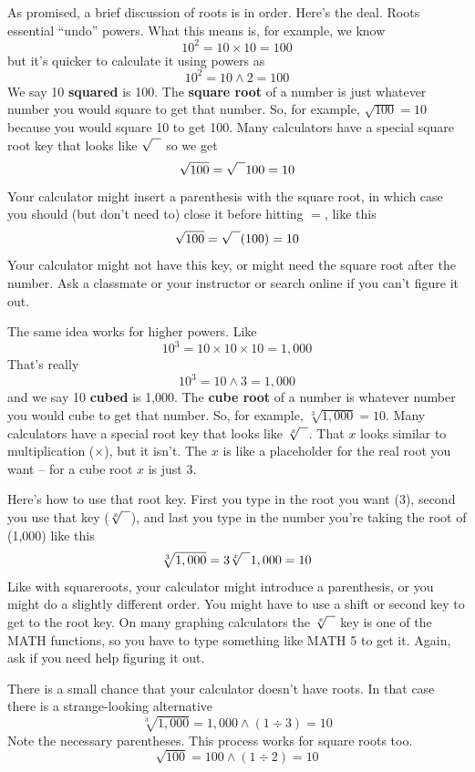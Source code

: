 As promised, a brief discussion of roots is in order.  
Here's the deal.  Roots essential ``undo'' powers.  What this means is, for example, we know $$10^2=10 \times 10 =100$$  but it's quicker to calculate it using powers as $$10^2 = 10 \wedge 2 = 100$$  We say 10 \textbf{squared} is 100.  The \textbf{square root} of a number is just whatever number you would square to get that number.  So, for example, $\sqrt{100} = 10$ because you would square 10 to get 100.  Many calculators have a special square root key that looks like $\sqrt{\text{\raisebox{.6em}{~\text{  }}}} $ so we get 
$$\sqrt{100} = \sqrt{\text{\raisebox{.6em}{~\text{  }}}} 100 = 10$$  
Your calculator might insert a parenthesis with the square root, in which case you should (but don't need to) close it before hitting $=$, like this
$$\sqrt{100} = \sqrt{\text{\raisebox{.6em}{~\text{  }}}} ( 100 ) = 10$$ 
Your calculator might not have this key, or might need the square root after the number.  Ask a classmate or your instructor or search online if you can't figure it out.

The same idea works for higher powers.  Like $$10^3 =10 \times 10 \times 10 = 1,000$$ That's really  $$10^3 = 10 \wedge 3 = 1,000$$ and we say
10 \textbf{cubed} is 1,000.  The \textbf{cube root} of a number is whatever number you would cube to get that number.  So, for example, $\sqrt[3]{1,000} = 10$.  Many calculators have a special root key that looks like $\sqrt[x]{\text{\raisebox{.6em}{~\text{  }}}} $.  That $x$ looks similar to multiplication ($\times$), but it isn't.  The $x$ is like a placeholder for the real root you want -- for a cube root $x$ is just 3.  

Here's how to use that root key. First you type in the root you want (3), second you use that key ($\sqrt[x]{\text{\raisebox{.6em}{~\text{  }}}} $), and last you type in the number you're taking the root of (1,000) like this
$$\sqrt[3]{1,000} = 3\sqrt[x]{\text{\raisebox{.6em}{~\text{  }}}}1,000= 10$$
Like with squareroots, your calculator might introduce a parenthesis, or you might do a slightly different order.  You might have to use a shift or second key to get to the root key.  On many graphing calculators the $\sqrt[x]{\text{\raisebox{.6em}{~\text{  }}}} $ key is one of the MATH functions, so you have to type something like MATH 5 to get it.  Again, ask if you need help figuring it out.  

There is a small chance that your calculator doesn't have roots.  In that case there is a strange-looking alternative
$$\sqrt[3]{1,000} = 1,000 \wedge (1 \div 3)= 10$$
Note the necessary parentheses. This process works for square roots too.
$$\sqrt{100} = 100 \wedge (1 \div 2)= 10$$


